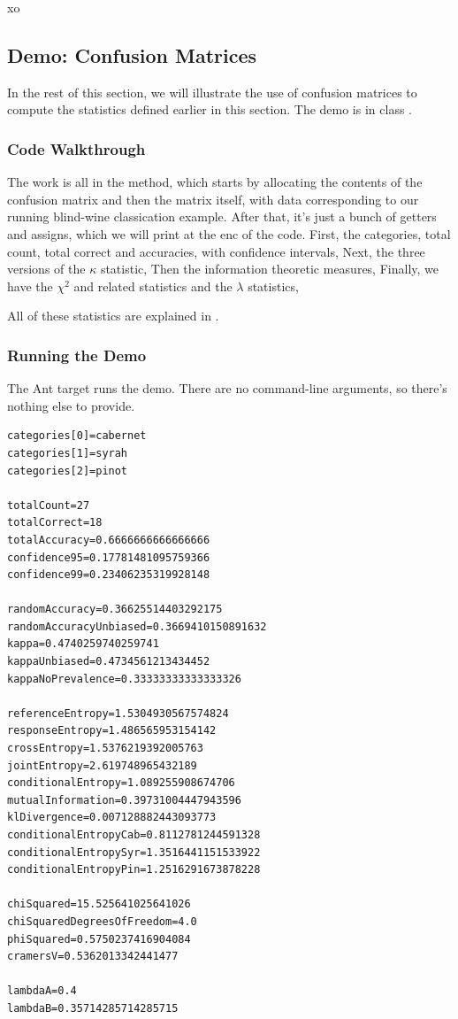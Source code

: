 xo\subsection{Demo: Confusion Matrices}\label{section:classifier-eval-confusion-matrix-demo}

In the rest of this section, we will illustrate the use of confusion
matrices to compute the statistics defined earlier in this section.
The demo is in class .

\subsubsection{Code Walkthrough}

The work is all in the  method, which starts by
allocating the contents of the confusion matrix and then the matrix
itself, with data corresponding to our running blind-wine classication
example.
%
%
After that, it's just a bunch of getters and assigns, which we will
print at the enc of the code.  First, the categories, total count,
total correct and accuracies, with confidence intervals,
%
%
Next, the three versions of the $\kappa$ statistic,
%
%
Then the information theoretic measures,
%
%
Finally, we have the $\chi^2$ and related statistics and the $\lambda$ statistics,
%

All of these statistics are explained in .


\subsubsection{Running the Demo}

The Ant target  runs the demo.  There are no command-line
arguments, so there's nothing else to provide.  
%
\begin{verbatim}
categories[0]=cabernet
categories[1]=syrah
categories[2]=pinot

totalCount=27
totalCorrect=18
totalAccuracy=0.6666666666666666
confidence95=0.17781481095759366
confidence99=0.23406235319928148

randomAccuracy=0.36625514403292175
randomAccuracyUnbiased=0.3669410150891632
kappa=0.4740259740259741
kappaUnbiased=0.4734561213434452
kappaNoPrevalence=0.33333333333333326

referenceEntropy=1.5304930567574824
responseEntropy=1.486565953154142
crossEntropy=1.5376219392005763
jointEntropy=2.619748965432189
conditionalEntropy=1.089255908674706
mutualInformation=0.39731004447943596
klDivergence=0.007128882443093773
conditionalEntropyCab=0.8112781244591328
conditionalEntropySyr=1.3516441151533922
conditionalEntropyPin=1.2516291673878228

chiSquared=15.525641025641026
chiSquaredDegreesOfFreedom=4.0
phiSquared=0.5750237416904084
cramersV=0.5362013342441477

lambdaA=0.4
lambdaB=0.35714285714285715
\end{verbatim}



